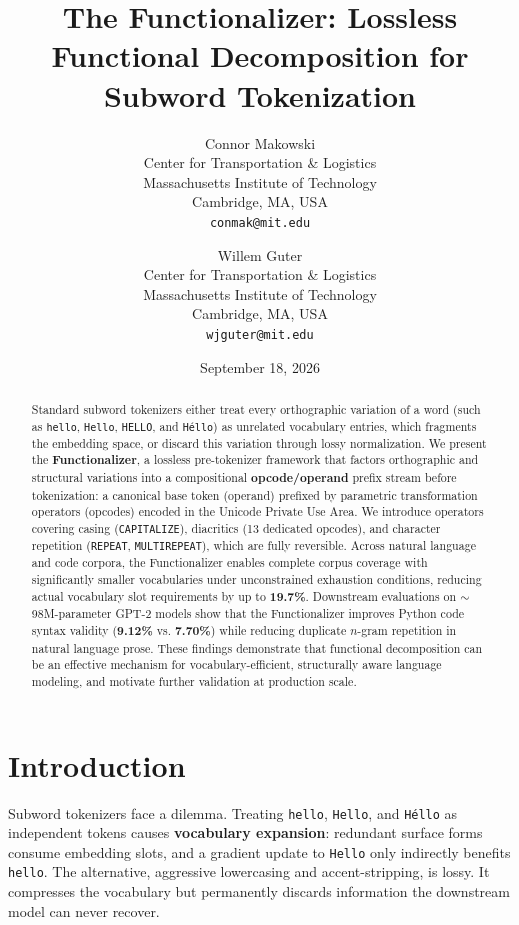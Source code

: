 \documentclass{article}
\title{The Functionalizer: Lossless Functional Decomposition for Subword Tokenization}
\author{
  Connor Makowski \\
  Center for Transportation \& Logistics \\
  Massachusetts Institute of Technology \\
  Cambridge, MA, USA \\
  \texttt{conmak@mit.edu}
  \and
  Willem Guter \\
  Center for Transportation \& Logistics \\
  Massachusetts Institute of Technology \\
  Cambridge, MA, USA \\
  \texttt{wjguter@mit.edu}
}
\date{September 18, 2026}
\begin{document}
\maketitle

\begin{abstract}
Standard subword tokenizers either treat every orthographic variation of a word (such as \texttt{hello}, \texttt{Hello}, \texttt{HELLO}, and \texttt{H\'{e}llo}) as unrelated vocabulary entries, which fragments the embedding space, or discard this variation through lossy normalization. We present the \textbf{Functionalizer}, a lossless pre-tokenizer framework that factors orthographic and structural variations into a compositional \textbf{opcode/operand} prefix stream before tokenization: a canonical base token (operand) prefixed by parametric transformation operators (opcodes) encoded in the Unicode Private Use Area. We introduce operators covering casing (\texttt{CAPITALIZE}), diacritics (13 dedicated opcodes), and character repetition (\texttt{REPEAT}, \texttt{MULTIREPEAT}), which are fully reversible. Across natural language and code corpora, the Functionalizer enables complete corpus coverage with significantly smaller vocabularies under unconstrained exhaustion conditions, reducing actual vocabulary slot requirements by up to \textbf{19.7\%}. Downstream evaluations on $\sim$98M-parameter GPT-2 models show that the Functionalizer improves Python code syntax validity (\textbf{9.12\%} vs. \textbf{7.70\%}) while reducing duplicate $n$-gram repetition in natural language prose. These findings demonstrate that functional decomposition can be an effective mechanism for vocabulary-efficient, structurally aware language modeling, and motivate further validation at production scale.
\end{abstract}

\section{Introduction}

Subword tokenizers face a dilemma. Treating \texttt{hello}, \texttt{Hello}, and \texttt{H\'{e}llo} as independent tokens causes \textbf{vocabulary expansion}: redundant surface forms consume embedding slots, and a gradient update to \texttt{Hello} only indirectly benefits \texttt{hello}. The alternative, aggressive lowercasing and accent-stripping, is lossy. It compresses the vocabulary but permanently discards information the downstream model can never recover.
\end{document}
